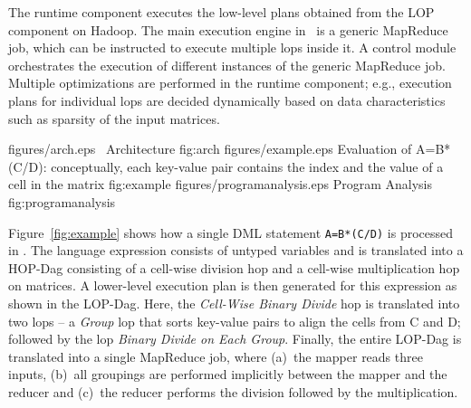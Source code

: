  The runtime component executes the low-level plans obtained from 
the LOP component on Hadoop. The main execution engine in \systemmlit\ is a generic 
MapReduce job, which can be instructed to execute multiple lops inside it. A control 
module orchestrates the execution of different instances of the generic MapReduce job.
Multiple optimizations are performed in the runtime component; e.g., execution plans for 
individual lops are decided dynamically based on data characteristics such as sparsity of 
the input matrices.


\sllsubfigures
{figures/arch.eps}
{\systemmltext \ Architecture}
{fig:arch}
{figures/example.eps}
{Evaluation of A=B*(C/D): conceptually, each key-value pair contains the index and the value of a cell in the matrix}
{fig:example}
{figures/programanalysis.eps}
{Program Analysis}
{fig:programanalysis}


Figure~\ref{fig:example} shows how a single DML statement \texttt{A=B*(C/D)} is processed in \systemmlit. The language expression consists of untyped variables and is translated into a HOP-Dag consisting of a cell-wise division hop and a cell-wise multiplication hop on matrices. A lower-level execution plan is then generated for this expression as shown in the LOP-Dag. Here, the {\it Cell-Wise Binary Divide} hop is translated into two lops -- a {\it Group} lop that sorts key-value pairs to align the cells from C and D; followed by the lop {\it Binary Divide on Each Group}. Finally, the entire LOP-Dag is translated into a single MapReduce job, where (a)~the mapper reads three inputs, (b)~all groupings are performed implicitly between the mapper and the reducer and (c)~the reducer performs the division followed by the multiplication.

